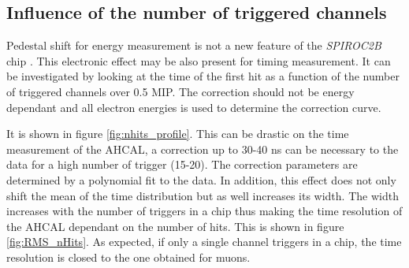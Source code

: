 \subsection{Influence of the number of triggered channels}
\label{subsec:ped_shift}

Pedestal shift for energy measurement is not a new feature of the \textit{SPIROC2B} chip \cite{Hartbrich2012}. This electronic effect may be also present for timing measurement. It can be investigated by looking at the time of the first hit as a function of the number of triggered channels over 0.5 MIP. The correction should not be energy dependant and all electron energies is used to determine the correction curve.

It is shown in figure \ref{fig:nhits_profile}. This can be drastic on the time measurement of the AHCAL, a correction up to 30-40 ns can be necessary to the data for a high number of trigger (15-20). The correction parameters are determined by a polynomial fit to the data. In addition, this effect does not only shift the mean of the time distribution but as well increases its width. The width increases with the number of triggers in a chip thus making the time resolution of the AHCAL dependant on the number of hits. This is shown in figure \ref{fig:RMS_nHits}. As expected, if only a single channel triggers in a chip, the time resolution is closed to the one obtained for muons.

